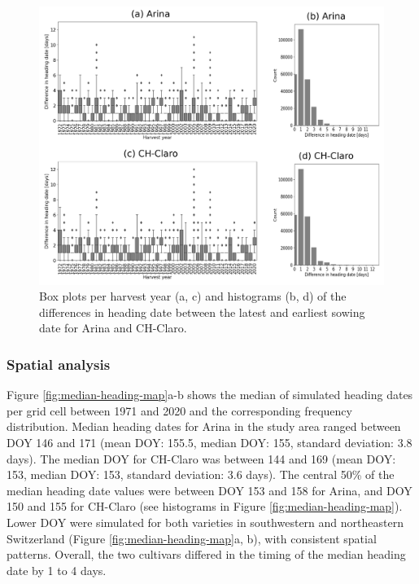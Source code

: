 \begin{figure}[H]
    \centering
    \includegraphics[width=\textwidth]{03-Heading-Dates/img/sowing_date_sensitivity.png}
    \caption{Box plots per harvest year (a, c) and histograms (b, d) of the differences in heading date between the latest and earliest sowing date for Arina and CH-Claro.}
    \label{fig:sowing-date-sensitivity}
\end{figure}


\subsubsection{Spatial analysis}

Figure \ref{fig:median-heading-map}a-b shows the median of simulated heading dates per grid cell between 1971 and 2020 and the corresponding frequency distribution. Median heading dates for Arina in the study area ranged between \gls{DOY} 146 and 171 (mean \gls{DOY}: 155.5, median \gls{DOY}: 155, standard deviation: 3.8 days). The median \gls{DOY} for CH-Claro was between 144 and 169 (mean \gls{DOY}: 153, median \gls{DOY}: 153, standard deviation: 3.6 days). The central 50\% of the median heading date values were between \gls{DOY} 153 and 158 for Arina, and \gls{DOY} 150 and 155 for CH-Claro (see histograms in Figure \ref{fig:median-heading-map}). Lower \gls{DOY} were simulated for both varieties in southwestern and northeastern Switzerland (Figure \ref{fig:median-heading-map}a, b), with consistent spatial patterns. Overall, the two cultivars differed in the timing of the median heading date by 1 to 4 days.

